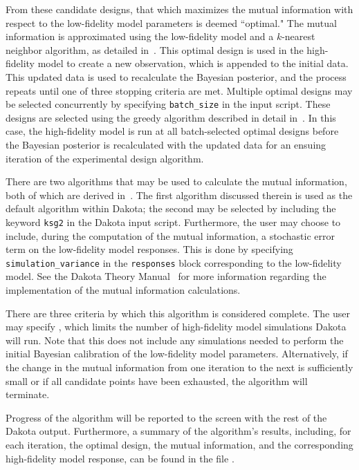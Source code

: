 From these candidate designs, that which maximizes the mutual information with
respect to the low-fidelity model parameters is deemed ``optimal." The mutual
information is approximated using the low-fidelity model and a $k$-nearest
neighbor algorithm, as detailed in~\cite{Lew16}. This optimal design is used in 
the high-fidelity model to create a new observation, which is appended to the 
initial data. This updated data is used to recalculate the Bayesian posterior,
and the process repeats until one of three stopping criteria are met.
Multiple optimal designs may be selected concurrently by specifying 
\texttt{batch\_size} in the input script. These designs are selected using
the greedy algorithm described in detail in~\cite{TheoMan}. In this case, the
high-fidelity model is run at all batch-selected optimal designs before the
Bayesian posterior is recalculated with the updated data for an ensuing 
iteration of the experimental design algorithm. 

There are two algorithms that may be used to calculate the mutual information,
both of which are derived in~\cite{Kra04}. The first algorithm discussed 
therein is used as the default algorithm within Dakota; the second may be 
selected by including the keyword \texttt{ksg2} in the Dakota input script. 
Furthermore, the user may choose to include, during the computation of the 
mutual information, a stochastic error term on the low-fidelity model 
responses. This is done by specifying \texttt{simulation\_variance} in the 
\texttt{responses} block corresponding to the low-fidelity model. See the 
Dakota Theory Manual~\cite{TheoMan} for more information regarding the 
implementation of the mutual information calculations.

There are three criteria by which this algorithm is considered complete. 
The user may specify , which limits the number 
of high-fidelity model simulations Dakota will run. Note that this does not 
include any simulations needed to perform the initial Bayesian calibration of 
the low-fidelity model parameters. Alternatively, if the change in the mutual 
information from one iteration to the next is sufficiently small or if all 
candidate points have been exhausted, the algorithm will terminate. 

Progress of the algorithm will be reported to the screen with the rest of the
Dakota output. Furthermore, a summary of the algorithm's results, including, 
for each iteration, the optimal design, the mutual information, and the 
corresponding high-fidelity model response, can be found in the file 
.

